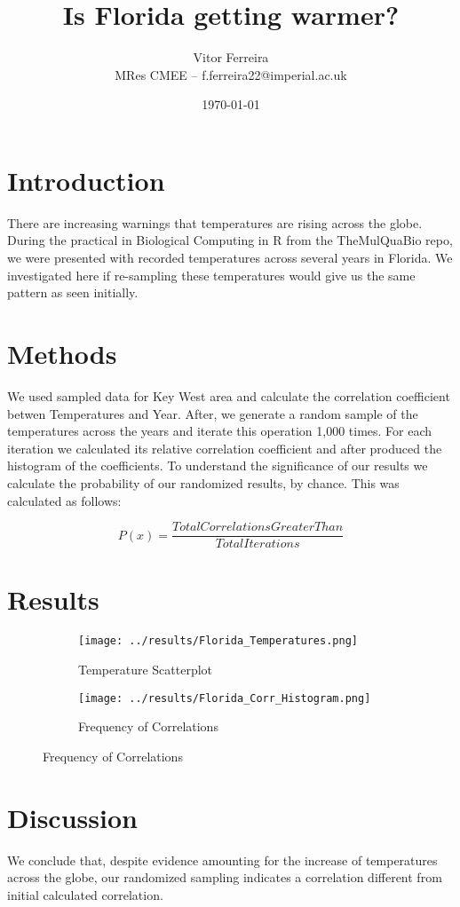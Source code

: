 \documentclass[12pt]{article}
\title{Is Florida getting warmer?}
\author{Vitor Ferreira \\ MRes CMEE -- f.ferreira22@imperial.ac.uk}
\date{\today}
\begin{document}
  \maketitle
  
    \section{Introduction}

    There are increasing warnings that temperatures are rising across the globe. During the practical in Biological Computing in R from the TheMulQuaBio repo, we were presented with recorded temperatures across several years in Florida. We investigated here if re-sampling these temperatures would give us the same pattern as seen initially.
    
  \section{Methods}

    We used sampled data for Key West area and calculate the correlation coefficient betwen Temperatures and Year.
    After, we generate a random sample of the temperatures across the years and iterate this operation 1,000 times. For each iteration we calculated its relative correlation coefficient and after produced the histogram of the coefficients. To understand the significance of our results we calculate the probability of our randomized results, by chance.
    This was calculated as follows:
  
  \begin{equation}
    P(x) = \frac{TotalCorrelationsGreaterThan}{Total Iterations}
  \end{equation}


  \section{Results}

    \begin{figure}[H]
      \centering
      \begin{subfigure}{.45\textwidth}
        \centering
        \texttt{[image: ../results/Florida\_Temperatures.png]}
        \caption{Temperature Scatterplot}
        \label{fig:sub1}
      \end{subfigure}
      \begin{subfigure}{.45\textwidth}
        \centering
        \texttt{[image: ../results/Florida\_Corr\_Histogram.png]}
        \caption{Frequency of Correlations}
        \label{fig:sub2}
      \end{subfigure}
      \label{fig:test}
    \end{figure}


  \section{Discussion}

    We conclude that, despite evidence amounting for the increase of temperatures across the globe, our randomized sampling indicates a correlation different from initial calculated correlation.
    
    
  
   
\end{document}
